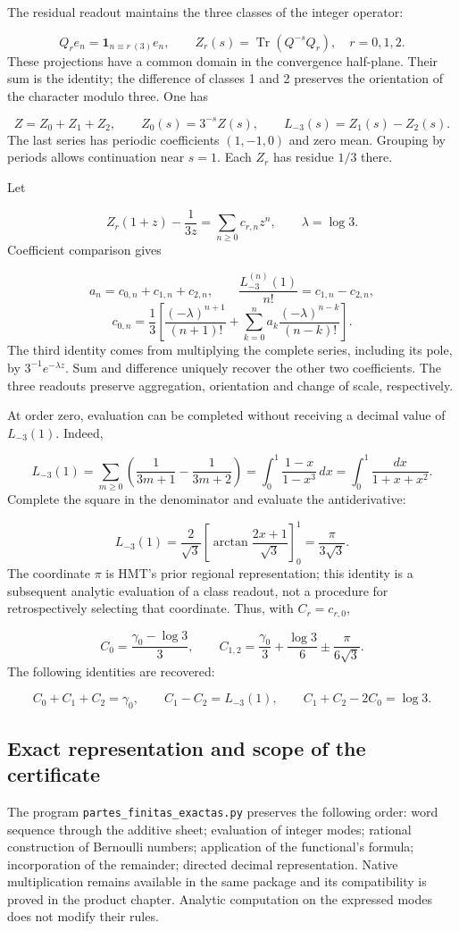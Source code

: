 The residual readout maintains the three classes of the integer operator:

\[
Q_re_n=\mathbf1_{n\equiv r\ (3)}e_n,\qquad
Z_r(s)=\operatorname{Tr}(Q^{-s}Q_r),\quad r=0,1,2.
\]
These projections have a common domain in the convergence half-plane. Their sum is the identity; the difference of classes 1 and 2 preserves the orientation of the character modulo three. One has

\[
Z=Z_0+Z_1+Z_2,\qquad Z_0(s)=3^{-s}Z(s),\qquad
L_{-3}(s)=Z_1(s)-Z_2(s).
\]
The last series has periodic coefficients \((1,-1,0)\) and zero mean. Grouping by periods allows continuation near \(s=1\). Each \(Z_r\) has residue \(1/3\) there.

Let

\[
Z_r(1+z)-\frac1{3z}=\sum_{n\geq0}c_{r,n}z^n,
\qquad \lambda=\log3.
\]
Coefficient comparison gives

\[
a_n=c_{0,n}+c_{1,n}+c_{2,n},\qquad
\frac{L_{-3}^{(n)}(1)}{n!}=c_{1,n}-c_{2,n},
\]
\[
c_{0,n}=\frac13\left[
\frac{(-\lambda)^{n+1}}{(n+1)!}
+\sum_{k=0}^na_k\frac{(-\lambda)^{n-k}}{(n-k)!}\right].
\]
The third identity comes from multiplying the complete series, including its pole, by \(3^{-1}e^{-\lambda z}\). Sum and difference uniquely recover the other two coefficients. The three readouts preserve aggregation, orientation and change of scale, respectively.

At order zero, evaluation can be completed without receiving a decimal value of \(L_{-3}(1)\). Indeed,

\[
L_{-3}(1)=\sum_{m\geq0}\left(\frac1{3m+1}-\frac1{3m+2}\right)
=\int_0^1\frac{1-x}{1-x^3}\,dx
=\int_0^1\frac{dx}{1+x+x^2}.
\]
Complete the square in the denominator and evaluate the antiderivative:

\[
L_{-3}(1)=\frac2{\sqrt3}
\left[\arctan\frac{2x+1}{\sqrt3}\right]_0^1
=\frac{\pi}{3\sqrt3}.
\]
The coordinate \(\pi\) is HMT's prior regional representation; this identity is a subsequent analytic evaluation of a class readout, not a procedure for retrospectively selecting that coordinate. Thus, with \(C_r=c_{r,0}\),

\[
C_0=\frac{\gamma_0-\log3}{3},\qquad
C_{1,2}=\frac{\gamma_0}{3}+\frac{\log3}{6}
\mathbin{\pm}\frac{\pi}{6\sqrt3}.
\]
The following identities are recovered:

\[
C_0+C_1+C_2=\gamma_0,\qquad
C_1-C_2=L_{-3}(1),\qquad C_1+C_2-2C_0=\log3.
\]
\clearpage
\subsection{Exact representation and scope of the certificate}
The program \texttt{partes\_\allowbreak{}finitas\_\allowbreak{}exactas.\allowbreak{}py} preserves the following order: word sequence through the additive sheet; evaluation of integer modes; rational construction of Bernoulli numbers; application of the functional's formula; incorporation of the remainder; directed decimal representation. Native multiplication remains available in the same package and its compatibility is proved in the product chapter. Analytic computation on the expressed modes does not modify their rules.

